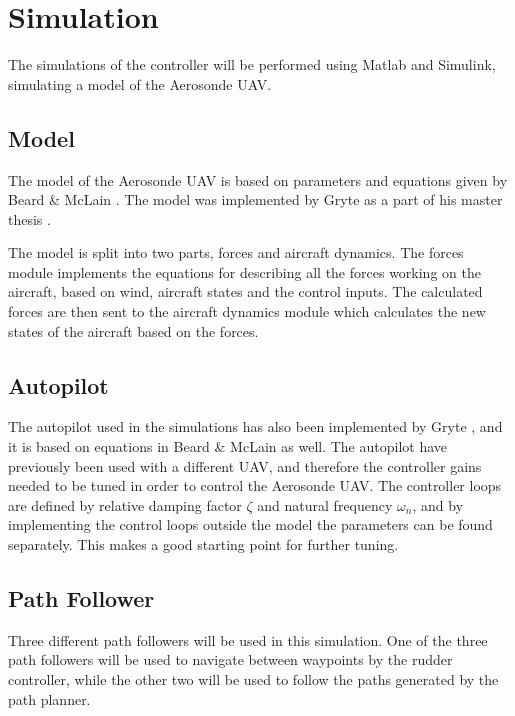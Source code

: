 \section{Simulation}
\label{ch:simulation}

The simulations of the controller will be performed using Matlab and Simulink, simulating a model of the Aerosonde UAV. 

\subsection{Model}

The model of the Aerosonde UAV is based on parameters and equations given by Beard \& McLain \cite{suaBEARD}. The model was implemented by Gryte as a part of his master thesis \cite{GRYTE}.

The model is split into two parts, forces and aircraft dynamics. The forces module implements the equations for describing all the forces working on the aircraft, based on wind, aircraft states and the control inputs. The calculated forces are then sent to the aircraft dynamics module which calculates the new states of the aircraft based on the forces.


\subsection{Autopilot}

The autopilot used in the simulations has also been implemented by Gryte \cite{GRYTE}, and it is based on equations in Beard \& McLain \cite{suaBEARD} as well. The autopilot have previously been used with a different UAV, and therefore the controller gains needed to be tuned in order to control the Aerosonde UAV. The controller loops are defined by relative damping factor $\zeta$ and natural frequency $\omega_n$, and by implementing the control loops outside the model the parameters can be found separately. This makes a good starting point for further tuning.

\subsection{Path Follower}
\label{ch:path_follower}

Three different path followers will be used in this simulation. One of the three path followers will be used to navigate between waypoints by the rudder controller, while the other two will be used to follow the paths generated by the path planner.

